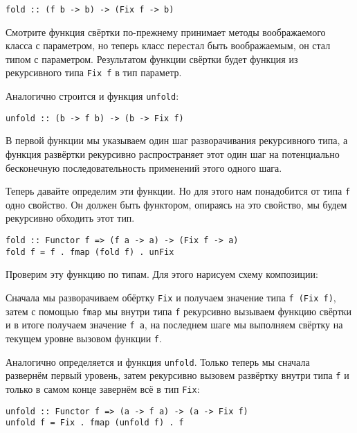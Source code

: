 \begin{verbatim}
fold :: (f b -> b) -> (Fix f -> b)
\end{verbatim}

Смотрите функция свёртки по-прежнему принимает методы воображаемого
класса с параметром, но теперь класс перестал быть воображаемым, он стал
типом с параметром. Результатом функции свёртки будет функция из
рекурсивного типа \texttt{Fix f} в тип параметр.

Аналогично строится и функция \texttt{unfold}:

\begin{verbatim}
unfold :: (b -> f b) -> (b -> Fix f)
\end{verbatim}

В первой функции мы указываем один шаг разворачивания рекурсивного типа,
а функция развёртки рекурсивно распространяет этот один шаг на
потенциально бесконечную последовательность применений этого одного
шага.

Теперь давайте определим эти функции. Но для этого нам понадобится от
типа \texttt{f} одно свойство. Он должен быть функтором, опираясь на это
свойство, мы будем рекурсивно обходить этот тип.

\begin{verbatim}
fold :: Functor f => (f a -> a) -> (Fix f -> a)
fold f = f . fmap (fold f) . unFix
\end{verbatim}

Проверим эту функцию по типам. Для этого нарисуем схему композиции:

\begin{centering}



\end{centering}

Сначала мы разворачиваем обёртку \texttt{Fix} и получаем значение типа
\texttt{f (Fix f)}, затем с помощью \texttt{fmap} мы внутри типа
\texttt{f} рекурсивно вызываем функцию свёртки и в итоге получаем
значение \texttt{f a}, на последнем шаге мы выполняем свёртку на текущем
уровне вызовом функции \texttt{f}.

Аналогично определяется и функция \texttt{unfold}. Только теперь мы
сначала развернём первый уровень, затем рекурсивно вызовем развёртку
внутри типа \texttt{f} и только в самом конце завернём всё в тип
\texttt{Fix}:

\begin{verbatim}
unfold :: Functor f => (a -> f a) -> (a -> Fix f)
unfold f = Fix . fmap (unfold f) . f
\end{verbatim}

